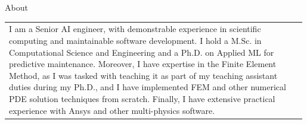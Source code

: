 \documentclass{resume_v2} %
\begin{document}
\begin{center}
\end{center}
\vspace{0.2cm}

\begin{rSection}{About}
  \begin{tabular}{p{0.99\linewidth}}
	  I am a Senior AI engineer, with demonstrable experience in scientific computing and maintainable software development. I hold a M.Sc. in Computational Science and Engineering and a Ph.D. on Applied ML for predictive maintenance. Moreover, I have expertise in the Finite Element Method, as I was tasked with teaching it as part of my teaching assistant duties during my Ph.D., and I have implemented FEM and other numerical PDE solution techniques from scratch. Finally, I have extensive practical experience with Ansys and other multi-physics software.
\end{tabular}
\end{rSection}

\vspace{-0.5cm}
\end{document}
